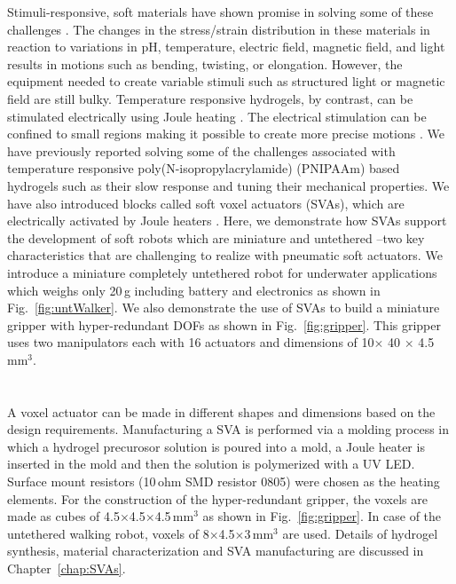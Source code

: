 Stimuli-responsive, soft materials have shown promise in solving some of these challenges \cite{Steele2018, Stuart2010,White2013}. The changes in the stress/strain distribution in these materials in reaction to variations in pH, temperature, electric field, magnetic field, and light results in motions such as bending, twisting, or elongation. However, the equipment needed to create variable stimuli such as structured light \cite{Palagi2016} or magnetic field \cite{Kim2018} are still bulky. Temperature responsive hydrogels, by contrast, can be stimulated electrically using Joule heating \cite{Yu2013}. The electrical stimulation can be confined to small regions making it possible to create more precise motions \cite{Richter2009}. We have previously reported solving some of the challenges associated with temperature responsive poly(N-isopropylacrylamide) (PNIPAAm) based hydrogels such as their slow response and tuning their mechanical properties. We have also introduced blocks called soft voxel actuators (SVAs), which are electrically activated by Joule heaters \cite{Khodambashi2021}. Here, we demonstrate how SVAs support the development of soft robots which are miniature and untethered --two key characteristics that are challenging to realize with pneumatic soft actuators. We introduce a miniature completely untethered robot for underwater applications which weighs only 20\,g including battery and electronics as shown in Fig.~\ref{fig:untWalker}. We also demonstrate the use of SVAs to build a miniature gripper with hyper-redundant DOFs as shown in Fig.~\ref{fig:gripper}. This gripper uses two manipulators each with 16 actuators and dimensions of 10$\times$ 40 $\times$ 4.5\,mm$^3$. 

	
\section{}
A voxel actuator can be made in different shapes and dimensions based on the design requirements. Manufacturing a SVA is performed via a molding process in which a hydrogel precurosor solution is poured into a mold, a Joule heater is inserted in the mold and then the solution is polymerized with a UV LED. Surface mount  resistors  (10\,ohm  SMD  resistor  0805) were chosen as the heating elements. For the construction of the hyper-redundant gripper, the voxels are made as cubes of 4.5$\times$4.5$\times$4.5\,mm$^3$ as shown in Fig.~\ref{fig:gripper}. In case of the untethered walking robot, voxels of 8$\times$4.5$\times$3\,mm$^3$ are used. Details of hydrogel synthesis, material characterization and SVA manufacturing are discussed in Chapter~\ref{chap:SVAs}.

